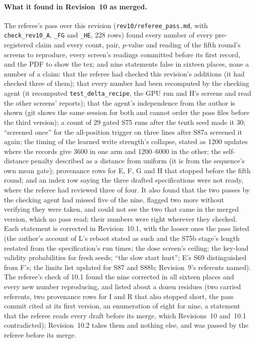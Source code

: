 \documentclass[11pt]{article}
\begin{document}
\paragraph{What it found in Revision~10 as merged.} The referee's pass over this revision (\texttt{rev10/referee\_pass.md}, with \texttt{check\_rev10\_A}, \texttt{\_FG} and \texttt{\_HE}, 228 rows) found every number of every pre-registered claim and every count, pair, $p$-value and reading of the fifth round's screens to reproduce, every screen's readings committed before its first record, and the PDF to show the tex; and nine statements false in sixteen places, none a number of a claim: that the referee had checked this revision's additions (it had checked three of them); that every number had been recomputed by the checking agent (it recomputed \texttt{test\_delta\_recipe}, the GPU run and H's screens and read the other screens' reports); that the agent's independence from the author is shown (git shows the same session for both and cannot order the pass files before the third version); a count of 29 gated S75 runs after the tenth seed made it 30; ``screened once'' for the all-position trigger on three lines after S87a screened it again; the timing of the learned write strength's collapse, stated as 1200 updates where the records give 3600 in one arm and 1200--6000 in the other; the self-distance penalty described as a distance from uniform (it is from the sequence's own mean gate); provenance rows for E, F, G and H that stopped before the fifth round; and an index row saying the three drafted specifications were not ready, where the referee had reviewed three of four. It also found that the two passes by the checking agent had missed five of the nine, flagged two more without verifying they were taken, and could not see the two that came in the merged version, which no pass read; their numbers were right wherever they checked. Each statement is corrected in Revision~10.1, with the looser ones the pass listed (the author's account of L's reboot stated as such and the S75b stage's length restated from the specification's run times; the dose screen's ceiling; the key-load validity probabilities for fresh seeds; ``the slow start hurt''; E's S69 distinguished from F's; the limits list updated for S87 and S88b; Revision~9's referents named). The referee's check of 10.1 found the nine corrected in all sixteen places and every new number reproducing, and listed about a dozen residues (two carried referents, two provenance rows for I and R that also stopped short, the pass commit cited at its first version, an enumeration of eight for nine, a statement that the referee reads every draft before its merge, which Revisions~10 and~10.1 contradicted); Revision~10.2 takes them and nothing else, and was passed by the referee before its merge.
\end{document}
